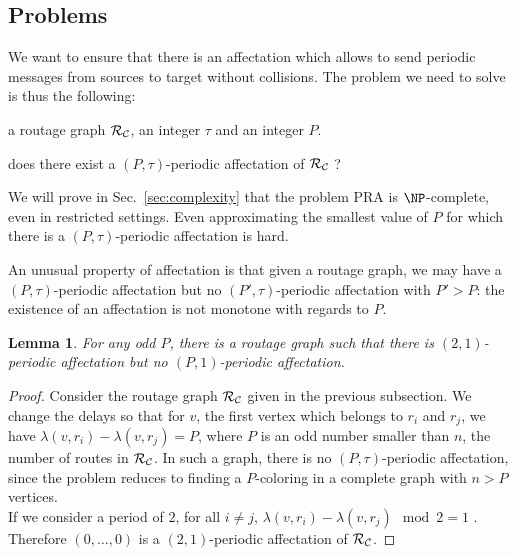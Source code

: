\documentclass[a4paper,10pt]{article}
\newtheorem{lemma}[theorem]{Lemma}
\begin{document}
   \subsection{Problems}\label{nonmonotone}

    We want to ensure that there is an affectation which allows to send periodic messages from sources to target
    without collisions. The problem we need to solve is thus the following:
    


       a routage graph $\cal R_{\cal C}$, an integer $\tau$ and an integer $P$.

       does there exist a $(P,\tau)$-periodic affectation of $\cal R_{\cal C}$ ?


      We will prove in Sec.~\ref{sec:complexity} that the problem PRA is $\NP$-complete, even in restricted settings.
      Even approximating the smallest value of $P$ for which there is a $(P,\tau)$-periodic affectation is hard.

      An unusual property of affectation is that given a routage graph, we may have a $(P,\tau)$-periodic affectation but no
      $(P',\tau)$-periodic affectation with $P' > P$: the existence of an affectation is not monotone with regards to $P$.

	\begin{lemma} \label{lemma:monotonic}
	 For any odd $P$, there is a routage graph such that there is $(2,1)$-periodic affectation but no $(P,1)$-periodic affectation.
	\end{lemma}
\begin{proof}

      Consider the routage graph ${\cal R_{\cal C}}$ given in the previous subsection. 
      We change the delays so that for $v$, the first vertex which belongs to $r_i$ and $r_j$,
      we have $\lambda(v,r_i) - \lambda(v,r_j)= P$, where $P$ is an odd number smaller than $n$, the number of routes in ${\cal R_{\cal C}}$. In such a graph, there is no $(P,\tau)$-periodic affectation, since the problem reduces to finding a $P$-coloring in a complete graph with $n > P$ vertices.\\
      If we consider a period of $2$, for all $i \neq j$, $\lambda(v,r_i) - \lambda(v,r_j) \mod 2 = 1$ . Therefore $(0,\dots,0)$ is a $(2,1)$-periodic affectation of ${\cal R_{\cal C}}$.

      
\end{proof}
      
\end{document}
